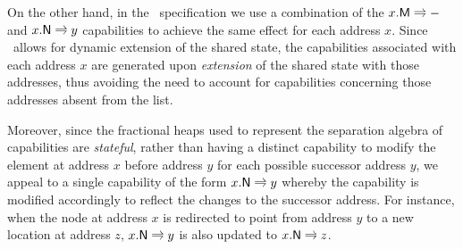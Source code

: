 On the other hand, in the \colosl\ specification we use a combination of the $\modT{x}$ and $\nextT{x}{y}$ capabilities to achieve the same effect for each address $x$. Since \colosl\ allows for dynamic extension of the shared state, the capabilities associated with each address $x$ are generated upon \emph{extension} of the shared state with those addresses, thus avoiding the need to account for capabilities concerning those addresses absent from the list. 

Moreover, since the fractional heaps used to represent the separation algebra of capabilities are \emph{stateful}, rather than having a distinct capability to modify the element at address $x$ before address $y$ for each possible successor address $y$, we appeal to a single capability of the form $\nextT{x}{y}$ whereby the capability is modified accordingly to reflect the changes to the successor address. For instance, when the node at address $x$ is redirected to point from address $y$ to a new location at address $z$, $\nextT{x}{y}$ is also updated to $\nextT{x}{z}$. 


